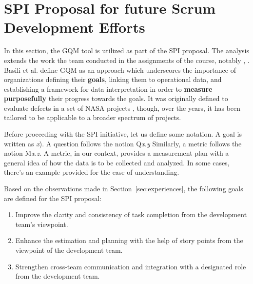\documentclass[conference]{IEEEtran}
\begin{document}
\section{SPI Proposal for future Scrum Development Efforts}
\label{sec:proposal}


In this section, the {\selectfont GQM} tool is utilized as part
of the SPI proposal. The analysis extends the work the team conducted in the
assignments of the course, notably \cite{DIT348A3}, \cite{DIT348A4}. Basili et
al. \cite{Caldiera1994} define GQM as an approach which underscores the
importance of organizations defining their \textbf{goals}, linking them to
operational data, and establishing a framework for data interpretation in order
to \textbf{measure purposefully} their progress towards the goals. It was
originally defined to evaluate defects in a set of NASA projects
\cite{Caldiera1994}, though, over the years, it has been tailored to be
applicable to a broader spectrum of projects.

Before proceeding with the SPI initiative, let us define some notation. A goal
is written as \textit{x}). A question follows the notion Q\textit{x.y}
Similarly, a metric follows the notion M\textit{x.z}. A metric, in our context,
provides a measurement plan with a general idea of how the data is to be
collected and analyzed. In some cases, there's an example provided for the ease
of understanding.

Based on the observations made in Section~\ref{sec:experiences}, the following
goals are defined for the SPI proposal:

\begin{enumerate}
  \item Improve the clarity and consistency of task completion from the
    development team’s viewpoint.
  \item Enhance the estimation and planning with the help of story points
    from the viewpoint of the development team. 
  \item Strengthen cross-team communication and integration with a
    designated role from the development team. 
\end{enumerate}
\end{document}
